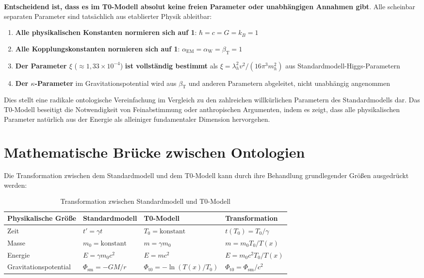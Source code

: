 \documentclass[12pt,a4paper]{article}
\newcommand{\Tfield}{T(x)}
\newcommand{\betaT}{\beta_{\text{T}}}
\newcommand{\alphaEM}{\alpha_{\text{EM}}}
\newcommand{\alphaW}{\alpha_{\text{W}}}
\newcommand{\Tzero}{T_0}
\begin{document}
	\textbf{Entscheidend ist, dass es im T0-Modell absolut keine freien Parameter oder unabhängigen Annahmen gibt}. Alle scheinbar separaten Parameter sind tatsächlich aus etablierter Physik ableitbar:
	
	\begin{enumerate}
		\item \textbf{Alle physikalischen Konstanten normieren sich auf 1}: $\hbar = c = G = k_B = 1$
		\item \textbf{Alle Kopplungskonstanten normieren sich auf 1}: $\alphaEM = \alphaW = \betaT = 1$
		\item \textbf{Der Parameter $\xi$} ($\approx 1,33 \times 10^{-4}$) \textbf{ist vollständig bestimmt} als $\xi = \lambda_h^2 v^2 / (16 \pi^3 m_h^2)$ aus Standardmodell-Higgs-Parametern
		\item \textbf{Der $\kappa$-Parameter} im Gravitationspotential wird aus $\betaT$ und anderen Parametern abgeleitet, nicht unabhängig angenommen
	\end{enumerate}
	
	Dies stellt eine radikale ontologische Vereinfachung im Vergleich zu den zahlreichen willkürlichen Parametern des Standardmodells dar. Das T0-Modell beseitigt die Notwendigkeit von Feinabstimmung oder anthropischen Argumenten, indem es zeigt, dass alle physikalischen Parameter natürlich aus der Energie als alleiniger fundamentaler Dimension hervorgehen.
	
	\section{Mathematische Brücke zwischen Ontologien}
	
	Die Transformation zwischen dem Standardmodell und dem T0-Modell kann durch ihre Behandlung grundlegender Größen ausgedrückt werden:
	
	\begin{table}[h]
		\centering
		\begin{tabular}{>{\RaggedRight}p{} >{\RaggedRight}p{} >{\RaggedRight}p{} >{\RaggedRight}p{}}
			\toprule
			\textbf{Physikalische Größe} & \textbf{Standardmodell} & \textbf{T0-Modell} & \textbf{Transformation} \\
			\midrule
			Zeit & $t' = \gamma t$ & $\Tzero = \text{konstant}$ & $t(\Tzero) = \Tzero / \gamma$ \\
			Masse & $m_0 = \text{konstant}$ & $m = \gamma m_0$ & $m = m_0 \Tzero / \Tfield$ \\
			Energie & $E = \gamma m_0 c^2$ & $E = m c^2$ & $E = m_0 c^2 \Tzero / \Tfield$ \\
			Gravitationspotential & $\Phi_{\text{sm}} = -GM/r$ & $\Phi_{\text{t0}} = -\ln(\Tfield / \Tzero)$ & $\Phi_{\text{t0}} = \Phi_{\text{sm}} / c^2$ \\
			\bottomrule
		\end{tabular}
		\caption{Transformation zwischen Standardmodell und T0-Modell}
	\end{table}
	
\end{document}
